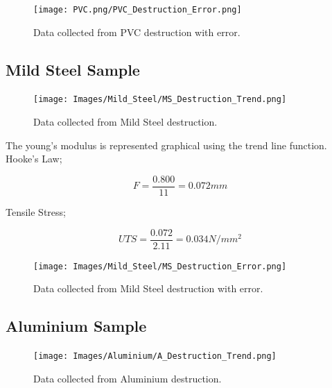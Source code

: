 \documentclass[11pt]{article}
\begin{document}
\begin{multicols}{2}
\begin{figure}[H]
\centering
\texttt{[image: PVC.png/PVC\_Destruction\_Error.png]}
\caption{Data collected from PVC destruction with error.}
\label{PVC Destruction Error}
\end{figure}

\cite{LLR.2-2018}


\subsection{Mild Steel Sample}
\label{Mild Steel Sample SubSection}

\begin{figure}[H]
\centering
\texttt{[image: Images/Mild\_Steel/MS\_Destruction\_Trend.png]}
\caption{Data collected from Mild Steel destruction.}
\label{Mild Steel Destruction Trend}
\end{figure}

The young's modulus is represented graphical using the trend line function. \\

Hooke's Law;

\begin{equation}
{F = \dfrac{0.800}{11}=0.072mm}
\end{equation}

Tensile Stress;

\begin{equation}
{UTS = \dfrac{0.072}{2.11}=0.034N/mm^2}
\end{equation}

\begin{figure}[H]
\centering
\texttt{[image: Images/Mild\_Steel/MS\_Destruction\_Error.png]}
\caption{Data collected from Mild Steel destruction with error.}
\label{Mild Steel Destruction Error}
\end{figure}


\subsection{Aluminium Sample}
\label{Alumnium Sample SubSection}

\begin{figure}[H]
\centering
\texttt{[image: Images/Aluminium/A\_Destruction\_Trend.png]}
\caption{Data collected from Aluminium destruction.}
\label{Aluminium Destruction Trend}
\end{figure}


\end{multicols}
\end{document}
